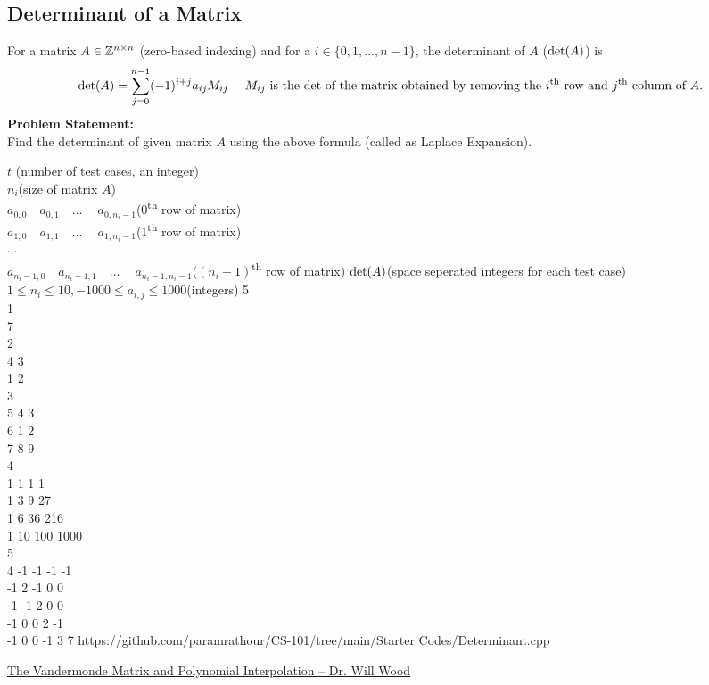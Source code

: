 \documentclass[../../Problems]{subfiles}
\begin{document}
\subsection{Determinant of a Matrix}
For a matrix $A\in \mathbb{Z}^{n\times n}$ (zero-based indexing) and for a $i\in\{0,1,\ldots,n-1\}$, the determinant of $A$ ($\operatorname{det}(A)$) is
\begin{equation}
\det(A)=\sum _{j=0}^{n-1}(-1)^{i+j}a_{ij}M_{ij}%
\quad \text{ $M_{ij}$ is the $\op{det}$ of the matrix obtained by removing the $i$\textsuperscript{th} row and $j$\textsuperscript{th} column of $A$.}%
\end{equation}
\textbf{Problem Statement:}\\
Find the determinant of given matrix $A$ using the above formula (called as Laplace Expansion).
\begin{testcases}
	{$t$ \hfill(number of test cases, an integer)\\$n_i$\hfill(size of matrix $A$)\\$a_{0,0}\quad a_{0,1}\quad \ldots \quad\ a_{0,n_i-1}$\quad\hfill($0$\textsuperscript{th} row of matrix)\\$a_{1,0}\quad a_{1,1}\quad \ldots \quad\ a_{1,n_i-1}$\quad \hfill($1$\textsuperscript{th} row of matrix)\\$\cdots$\\$a_{n_i-1,0}\quad a_{n_i-1,1}\quad \ldots \quad\ a_{n_i-1,n_i-1}$\hfill($(n_i-1)$\textsuperscript{th} row of matrix)}
	{$\operatorname{det}(A)$\hfill(space seperated integers for each test case)}
	{$1\leq n_i \leq 10, -1000\leq a_{i,j}\leq 1000$\hfill(integers)}
	{5\\1\\7\\2\\4 3\\1 2\\3\\5 4 3\\6 1 2\\7 8 9\\4\\1 1 1 1\\1 3 9 27\\1 6 36 216\\1 10 100 1000\\5\\4 -1 -1 -1 -1\\-1 2 -1 0 0\\-1 -1 2 0 0 \\-1 0 0 2 -1\\-1 0 0 -1 3}
	{7}
	{https://github.com/paramrathour/CS-101/tree/main/Starter Codes/Determinant.cpp}
\end{testcases}
\begin{funvideo}
	\href{https://youtu.be/Cov_kLatdlc}{The Vandermonde Matrix and Polynomial Interpolation -- Dr. Will Wood}
\end{funvideo}
\end{document}
